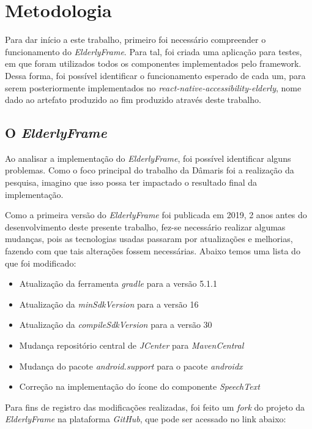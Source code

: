 \documentclass[
	12pt,				    %
	openright,			    %
	oneside,			    %
	a4paper,			    %
    sumario=tradicional,    %
	english,			    %
	brazil,				    %
	]{abntex2}              %
\begin{document}
\chapter{Metodologia}\label{sec:metodologia}

Para dar início a este trabalho, primeiro foi necessário compreender o funcionamento do \textit{ElderlyFrame}. Para tal, foi criada uma aplicação para testes, em que foram utilizados todos os componentes implementados pelo framework. Dessa forma, foi possível identificar o funcionamento esperado de cada um, para serem posteriormente implementados no \textit{react-native-accessibility-elderly}, nome dado ao artefato produzido ao fim produzido através deste trabalho.

\section{O \textit{ElderlyFrame}}

Ao analisar a implementação do \textit{ElderlyFrame}, foi possível identificar alguns problemas. Como o foco principal do trabalho da Dâmaris foi a realização da pesquisa, imagino que isso possa ter impactado o resultado final da implementação.

Como a primeira versão do \textit{ElderlyFrame} foi publicada em 2019, 2 anos antes do desenvolvimento deste presente trabalho, fez-se necessário realizar algumas mudanças, pois as tecnologias usadas passaram por atualizações e melhorias, fazendo com que tais alterações fossem necessárias. Abaixo temos uma lista do que foi modificado:

\begin{itemize}
	\item Atualização da ferramenta \textit{gradle} para a versão 5.1.1
	\item Atualização da \textit{minSdkVersion} para a versão 16
	\item Atualização da \textit{compileSdkVersion} para a versão 30
	\item Mudança repositório central de \textit{JCenter} para \textit{MavenCentral}
	\item Mudança do pacote \textit{android.support} para o pacote \textit{androidx}
	\item Correção na implementação do ícone do componente \textit{SpeechText}
\end{itemize}

Para fins de registro das modificações realizadas, foi feito um \textit{fork} do projeto da \textit{ElderlyFrame} na plataforma \textit{GitHub}, que pode ser acessado no link abaixo: \linebreak
\end{document}
